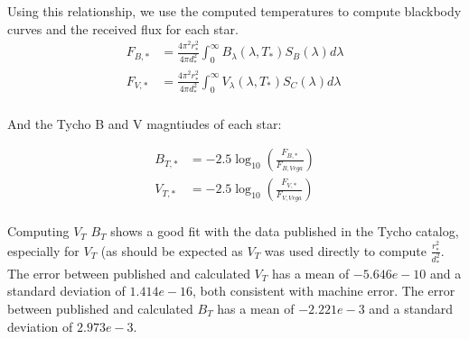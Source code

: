 \documentclass[]{DINOReportMemo}
\begin{document}
Using this relationship, we use the computed temperatures to compute blackbody curves and the received flux for each star.
\begin{equation}
\begin{split}
    F_{B,*} &= \frac{4\pi^2r_*^2}{4\pi d_*^2}\int_0^\infty B_\lambda(\lambda,T_*)S_B(\lambda)d\lambda \\
    F_{V,*} &= \frac{4\pi^2r_*^2}{4\pi d_*^2}\int_0^\infty V_\lambda(\lambda,T_*)S_C(\lambda)d\lambda \\
\end{split}
\end{equation}

And the Tycho B and V magntiudes of each star:

\begin{equation}
\begin{split}
   B_{T,*} &= -2.5\log_{10}\left(\frac{F_{B,*}}{F_{B,Vega}}\right) \\
   V_{T,*} &= -2.5\log_{10}\left(\frac{F_{V,*}}{F_{V,Vega}}\right) \\
\end{split}
\end{equation}

Computing $V_T$ $B_T$ shows a good fit with the data published in the Tycho catalog, especially for $V_T$ (as should be expected as $V_T$ was used directly to compute $\frac{r_*^2}{d_*^2}$. The error between published and calculated $V_T$ has a mean of $-5.646e-10$ and a standard deviation of $1.414e-16$, both consistent with machine error. The error between published and calculated $B_T$ has a mean of $-2.221e-3$ and a standard deviation of $2.973e-3$.
\end{document}
